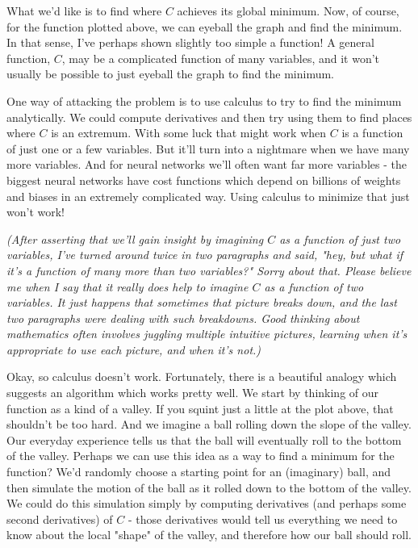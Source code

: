 \documentclass[a4paper,12pt]{report}%
\begin{document}
What we'd like is to find where $C$ achieves its global minimum. Now, of course, for the function plotted above, we can eyeball the graph and find the minimum. In that sense, I've perhaps shown slightly too simple a function! A general function, $C$, may be a complicated function of many variables, and it won't usually be possible to just eyeball the graph to find the minimum.

One way of attacking the problem is to use calculus to try to find the minimum analytically. We could compute derivatives and then try using them to find places where $C$ is an extremum. With some luck that might work when $C$ is a function of just one or a few variables. But it'll turn into a nightmare when we have many more variables. And for neural networks we'll often want far more variables - the biggest neural networks have cost functions which depend on billions of weights and biases in an extremely complicated way. Using calculus to minimize that just won't work!

{\it (After asserting that we'll gain insight by imagining $C$ as a function of just two variables, I've turned around twice in two paragraphs and said, "hey, but what if it's a function of many more than two variables?" Sorry about that. Please believe me when I say that it really does help to imagine $C$ as a function of two variables. It just happens that sometimes that picture breaks down, and the last two paragraphs were dealing with such breakdowns. Good thinking about mathematics often involves juggling multiple intuitive pictures, learning when it's appropriate to use each picture, and when it's not.)}

\smallskip

Okay, so calculus doesn't work. Fortunately, there is a beautiful analogy which suggests an algorithm which works pretty well. We start by thinking of our function as a kind of a valley. If you squint just a little at the plot above, that shouldn't be too hard. And we imagine a ball rolling down the slope of the valley. Our everyday experience tells us that the ball will eventually roll to the bottom of the valley. Perhaps we can use this idea as a way to find a minimum for the function? We'd randomly choose a starting point for an (imaginary) ball, and then simulate the motion of the ball as it rolled down to the bottom of the valley. We could do this simulation simply by computing derivatives (and perhaps some second derivatives) of $C$ - those derivatives would tell us everything we need to know about the local "shape" of the valley, and therefore how our ball should roll.
\end{document}
